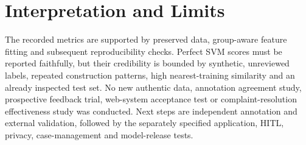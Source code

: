 \section{Interpretation and Limits}
The recorded metrics are supported by preserved data, group-aware feature fitting and subsequent reproducibility checks. Perfect SVM scores must be reported faithfully, but their credibility is bounded by synthetic, unreviewed labels, repeated construction patterns, high nearest-training similarity and an already inspected test set. No new authentic data, annotation agreement study, prospective feedback trial, web-system acceptance test or complaint-resolution effectiveness study was conducted. Next steps are independent annotation and external validation, followed by the separately specified application, HITL, privacy, case-management and model-release tests.
